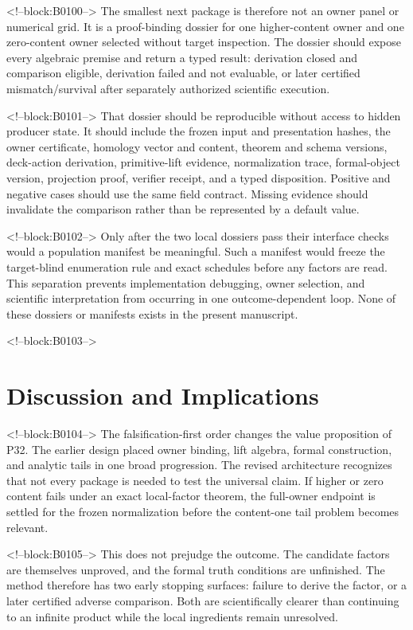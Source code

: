 \documentclass[11pt]{article}
\begin{document}
<!--block:B0100-->
The smallest next package is therefore not an owner panel or numerical
grid. It is a proof-binding dossier for one higher-content owner and one
zero-content owner selected without target inspection. The dossier
should expose every algebraic premise and return a typed result:
derivation closed and comparison eligible, derivation failed and not
evaluable, or later certified mismatch/survival after separately
authorized scientific execution.

<!--block:B0101-->
That dossier should be reproducible without access to hidden producer
state. It should include the frozen input and presentation hashes, the
owner certificate, homology vector and content, theorem and schema
versions, deck-action derivation, primitive-lift evidence, normalization
trace, formal-object version, projection proof, verifier receipt, and a
typed disposition. Positive and negative cases should use the same
field contract. Missing evidence should invalidate the comparison
rather than be represented by a default value.

<!--block:B0102-->
Only after the two local dossiers pass their interface checks would a
population manifest be meaningful. Such a manifest would freeze the
target-blind enumeration rule and exact schedules before any factors are
read. This separation prevents implementation debugging, owner
selection, and scientific interpretation from occurring in one
outcome-dependent loop. None of these dossiers or manifests exists in
the present manuscript.

<!--block:B0103-->
\hypertarget{7-discussion-and-implications}{%
\section{Discussion and
Implications}\label{7-discussion-and-implications}}

<!--block:B0104-->
The falsification-first order changes the value proposition of P32. The
earlier design placed owner binding, lift algebra, formal construction,
and analytic tails in one broad progression. The revised architecture recognizes that
not every package is needed to test the universal claim. If higher or
zero content fails under an exact local-factor theorem, the full-owner
endpoint is settled for the frozen normalization before the content-one
tail problem becomes relevant.

<!--block:B0105-->
This does not prejudge the outcome. The candidate factors are themselves
unproved, and the formal truth conditions are unfinished. The method
therefore has two early stopping surfaces: failure to derive the factor,
or a later certified adverse comparison. Both are scientifically clearer
than continuing to an infinite product while the local ingredients
remain unresolved.
\end{document}
